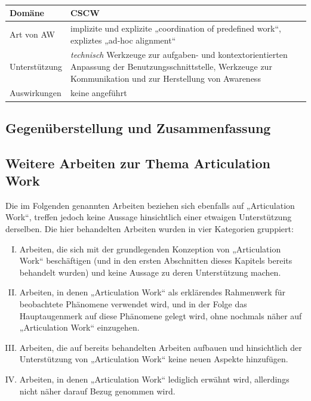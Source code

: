 \\[1em]
\begin{tabular}{| p{3cm} | p{10cm} |}
  \hline
  Domäne & CSCW \\ \hline
  Art von AW & implizite und explizite „coordination of predefined work“, expliztes „ad-hoc alignment“\\ \hline
  Unterstützung & \emph{technisch} Werkzeuge zur aufgaben- und kontextorientierten Anpassung der Benutzungsschnittstelle, Werkzeuge zur Kommunikation und zur Herstellung von Awareness \\ \hline
  Auswirkungen & keine angeführt \\ \hline
\end{tabular}

\subsection{Gegenüberstellung und Zusammenfassung} %
\label{sub:gegenüberstellung_und_zusammenfassung}




\subsection{Weitere Arbeiten zur Thema Articulation Work} %
\label{sub:weitere_arbeiten_zur_thema_articulation_work}

Die im Folgenden genannten Arbeiten beziehen sich ebenfalls auf „Articulation Work“, treffen jedoch keine Aussage hinsichtlich einer etwaigen Unterstützung derselben. Die hier behandelten Arbeiten wurden in vier Kategorien gruppiert:
\begin{enumerate}[(I)]
	\item Arbeiten, die sich mit der grundlegenden Konzeption von „Articulation Work“ beschäftigen (und in den ersten Abschnitten dieses Kapitels bereits behandelt wurden) und keine Aussage zu deren Unterstützung machen.
	\item Arbeiten, in denen „Articulation Work“ als erklärendes Rahmenwerk für beobachtete Phänomene verwendet wird, und in der Folge das Hauptaugenmerk auf diese Phänomene gelegt wird, ohne nochmals näher auf „Articulation Work“ einzugehen.
	\item Arbeiten, die auf bereits behandelten Arbeiten aufbauen und hinsichtlich der Unterstützung von „Articulation Work“ keine neuen Aspekte hinzufügen.
	\item Arbeiten, in denen „Articulation Work“ lediglich erwähnt wird, allerdings nicht näher darauf Bezug genommen wird.
\end{enumerate}

